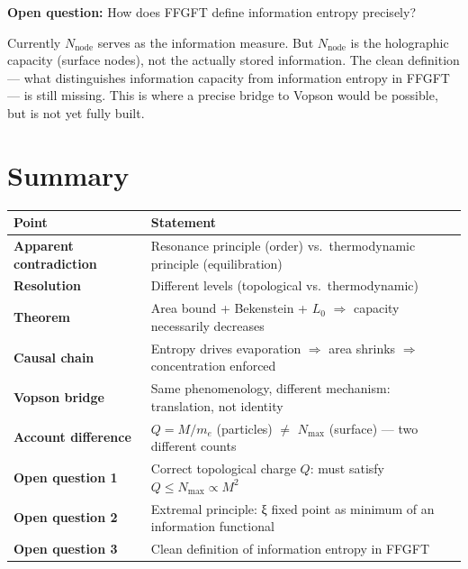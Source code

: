 \textbf{Open question:} How does FFGFT define information entropy precisely?

Currently $N_\text{node}$ serves as the information measure. But $N_\text{node}$ is the holographic capacity (surface nodes), not the actually stored information. The clean definition --- what distinguishes information capacity from information entropy in FFGFT --- is still missing. This is where a precise bridge to Vopson would be possible, but is not yet fully built.

\section*{Summary}

\begin{longtable}{>{\bfseries}p{5.5cm} p{8.5cm}}
\toprule
Point & Statement \\
\midrule
Apparent contradiction & Resonance principle (order) vs.\ thermodynamic principle (equilibration) \\
Resolution & Different levels (topological vs.\ thermodynamic) \\
Theorem & Area bound + Bekenstein + $L_0$ $\Rightarrow$ capacity necessarily decreases \\
Causal chain & Entropy drives evaporation $\Rightarrow$ area shrinks $\Rightarrow$ concentration enforced \\
Vopson bridge & Same phenomenology, different mechanism: translation, not identity \\
Account difference & $Q = M/m_e$ (particles) $\neq$ $N_\text{max}$ (surface) --- two different counts \\
Open question 1 & Correct topological charge $Q$: must satisfy $Q \leq N_\text{max} \propto M^2$ \\
Open question 2 & Extremal principle: ξ fixed point as minimum of an information functional \\
Open question 3 & Clean definition of information entropy in FFGFT \\
\bottomrule
\end{longtable}
